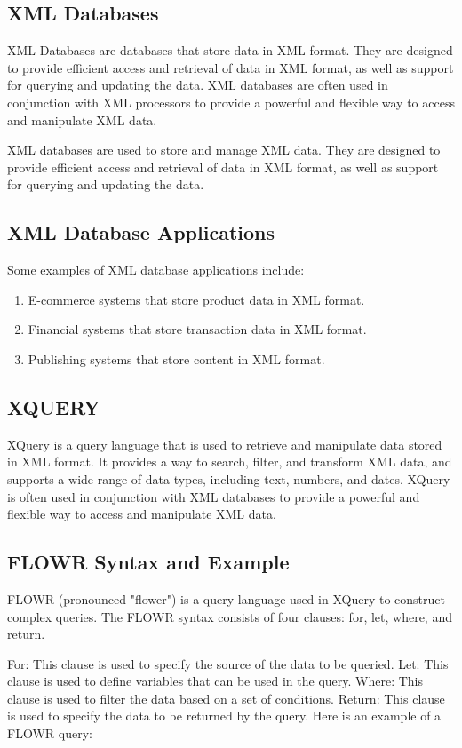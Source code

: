 \documentclass[11pt]{article}
\begin{document}
\subsection{XML Databases}

XML Databases are databases that store data in XML format. They are designed to provide efficient access and retrieval of data in XML format, as well as support for querying and updating the data. XML databases are often used in conjunction with XML processors to provide a powerful and flexible way to access and manipulate XML data.

XML databases are used to store and manage XML data. They are designed to provide efficient access and retrieval of data in XML format, as well as support for querying and updating the data.

\subsection{XML Database Applications}

Some examples of XML database applications include:

\begin{enumerate}
    \item E-commerce systems that store product data in XML format.
    \item Financial systems that store transaction data in XML format.
    \item Publishing systems that store content in XML format.
\end{enumerate}
\subsection{XQUERY}
XQuery is a query language that is used to retrieve and manipulate data stored in XML format. It provides a way to search, filter, and transform XML data, and supports a wide range of data types, including text, numbers, and dates. XQuery is often used in conjunction with XML databases to provide a powerful and flexible way to access and manipulate XML data.

\subsection{FLOWR Syntax and Example}
FLOWR (pronounced "flower") is a query language used in XQuery to construct complex queries. The FLOWR syntax consists of four clauses: for, let, where, and return.

For: This clause is used to specify the source of the data to be queried.
Let: This clause is used to define variables that can be used in the query.
Where: This clause is used to filter the data based on a set of conditions.
Return: This clause is used to specify the data to be returned by the query.
Here is an example of a FLOWR query:
\end{document}
